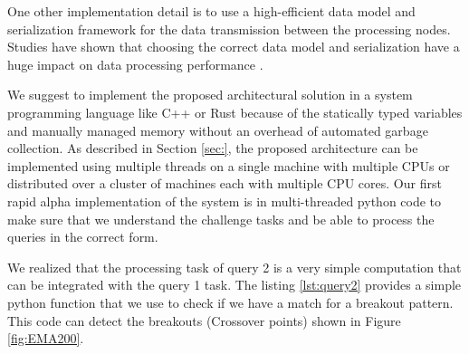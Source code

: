 One other implementation detail is to use a high-efficient data model and serialization framework for the data transmission between 
the processing nodes. Studies have shown that choosing the correct data model and serialization have a huge impact on data 
processing performance \cite{DBLP:conf/cloud/SikdarTJ17}. 

We suggest to implement the proposed architectural solution in a system programming language like C++ or Rust because of the statically typed variables and manually managed memory without an overhead of automated garbage collection. As described in Section \ref{sec:}, the proposed architecture can be implemented using multiple threads on a single machine with multiple CPUs or distributed over a cluster of machines each with multiple CPU cores. Our first rapid alpha implementation of the system is in multi-threaded python code to make sure that we understand the challenge tasks and be able to process the queries in the correct form.  

We realized that the processing task of query 2 is a very simple computation that can be integrated with the query 1 task. 
The listing \ref{lst:query2} provides a simple python function that we use to check if we have a match for a breakout pattern. 
This code can detect the breakouts (Crossover points) shown in Figure \ref{fig:EMA200}.


